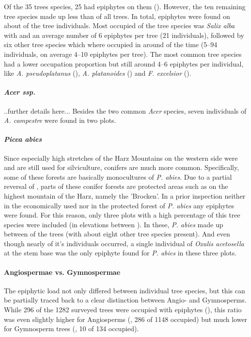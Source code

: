 \documentclass[12pt, a4paper, oneside, draft]{article}
\begin{document}
	Of the 35 trees species, 25 had epiphytes on them (). However, the ten remaining tree species made up less than  of all trees. In total, epiphytes were found on about  of the tree individuals. Most occupied of the tree species was \textit{Salix alba} with  and an average number of 6 epiphytes per tree (21 individuals), followed by six other tree species which where occupied in around  of the time (5--94 individuals, on average 4--10 epiphytes per tree). The most common tree species had a lower occupation proportion but still around 4--6 epiphytes per individual, like \textit{A. pseudoplatanus} (), \textit{A. platanoides} () and \textit{F. excelsior} ().
	
	
	
		\paragraph[Acer ssp.]{\textit{Acer ssp.}}
		..further details here... Besides the two common \textit{Acer} species, seven individuals of \textit{A. campestre} were found in two plots.
		
		\paragraph[Picea abies]{\textit{Picea abies}} Since especially high stretches of the Harz Mountains on the western side were and are still used for silviculture, conifers are much more common. Specifically, some of these forests are basically monocultures of \textit{P. abies}. Due to a partial reversal of ,  parts of these conifer forests are protected areas such as on the highest mountain of the Harz, namely the 'Brocken'. In a prior inspection neither in the economically used nor in the protected forest of \textit{P. abies} any epiphytes were found. For this reason, only three plots with a high percentage of this tree species were included (in elevations between ). In these, \textit{P. abies} made up between  of the trees (with about eight other tree species present). And even though nearly  of it's individuals occurred, a single individual of \textit{Oxalis acetosella} at the stem base was the only epiphyte found for \textit{P. abies} in these three plots. 
		
		\paragraph{Angiospermae vs. Gymnospermae}
		The epiphytic load not only differed between individual tree species, but this can be partially traced back to a clear distinction between Angio- and Gymnosperms. While 296 of the 1282 surveyed trees were occupied with epiphytes (), this ratio was even slightly higher for Angiosperms (, 286 of 1148 occupied) but much lower for Gymnosperm trees (, 10 of 134 occupied). 
		
\end{document}
